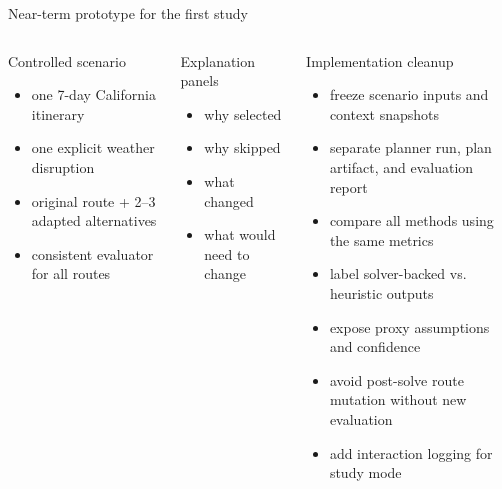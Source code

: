 \documentclass[aspectratio=169,10pt]{beamer}
\begin{document}
\begin{frame}{Near-term prototype for the first study}
\begin{columns}[T,onlytextwidth]
\begin{block}{Controlled scenario}
\begin{itemize}
\item one 7-day California itinerary
\item one explicit weather disruption
\item original route + 2--3 adapted alternatives
\item consistent evaluator for all routes
\end{itemize}
\end{block}

\begin{block}{Explanation panels}
\begin{itemize}
\item why selected
\item why skipped
\item what changed
\item what would need to change
\end{itemize}
\end{block}

\begin{block}{Implementation cleanup}
\begin{itemize}
\item freeze scenario inputs and context snapshots
\item separate planner run, plan artifact, and evaluation report
\item compare all methods using the same metrics
\item label solver-backed vs. heuristic outputs
\item expose proxy assumptions and confidence
\item avoid post-solve route mutation without new evaluation
\item add interaction logging for study mode
\end{itemize}
\end{block}
\end{columns}
\end{frame}
\end{document}

